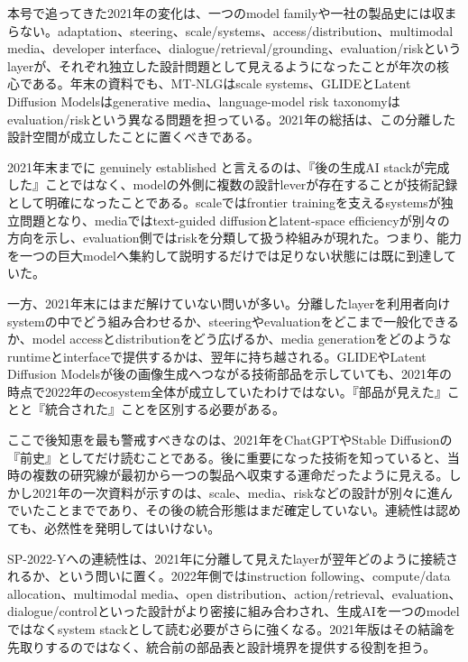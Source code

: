 
本号で追ってきた2021年の変化は、一つのmodel familyや一社の製品史には収まらない。adaptation、steering、scale/systems、access/distribution、multimodal media、developer interface、dialogue/retrieval/grounding、evaluation/riskというlayerが、それぞれ独立した設計問題として見えるようになったことが年次の核心である。年末の資料でも、MT-NLGはscale systems、GLIDEとLatent Diffusion Modelsはgenerative media、language-model risk taxonomyはevaluation/riskという異なる問題を担っている。2021年の総括は、この分離した設計空間が成立したことに置くべきである。\autocite{src-20fd9bba2e7a,src-50244427230b,src-a4561c635fe6,src-b307b4b82867}


2021年末までに genuinely established と言えるのは、『後の生成AI stackが完成した』ことではなく、modelの外側に複数の設計leverが存在することが技術記録として明確になったことである。scaleではfrontier trainingを支えるsystemsが独立問題となり、mediaではtext-guided diffusionとlatent-space efficiencyが別々の方向を示し、evaluation側ではriskを分類して扱う枠組みが現れた。つまり、能力を一つの巨大modelへ集約して説明するだけでは足りない状態には既に到達していた。\autocite{src-20fd9bba2e7a,src-50244427230b,src-a4561c635fe6,src-b307b4b82867}


一方、2021年末にはまだ解けていない問いが多い。分離したlayerを利用者向けsystemの中でどう組み合わせるか、steeringやevaluationをどこまで一般化できるか、model accessとdistributionをどう広げるか、media generationをどのようなruntimeとinterfaceで提供するかは、翌年に持ち越される。GLIDEやLatent Diffusion Modelsが後の画像生成へつながる技術部品を示していても、2021年の時点で2022年のecosystem全体が成立していたわけではない。『部品が見えた』ことと『統合された』ことを区別する必要がある。\autocite{src-50244427230b,src-a4561c635fe6}


ここで後知恵を最も警戒すべきなのは、2021年をChatGPTやStable Diffusionの『前史』としてだけ読むことである。後に重要になった技術を知っていると、当時の複数の研究線が最初から一つの製品へ収束する運命だったように見える。しかし2021年の一次資料が示すのは、scale、media、riskなどの設計が別々に進んでいたことまでであり、その後の統合形態はまだ確定していない。連続性は認めても、必然性を発明してはいけない。\autocite{src-20fd9bba2e7a,src-50244427230b,src-b307b4b82867}


SP-2022-Yへの連続性は、2021年に分離して見えたlayerが翌年どのように接続されるか、という問いに置く。2022年側ではinstruction following、compute/data allocation、multimodal media、open distribution、action/retrieval、evaluation、dialogue/controlといった設計がより密接に組み合わされ、生成AIを一つのmodelではなくsystem stackとして読む必要がさらに強くなる。2021年版はその結論を先取りするのではなく、統合前の部品表と設計境界を提供する役割を担う。\autocite{src-20fd9bba2e7a,src-50244427230b,src-a4561c635fe6,src-b307b4b82867}


